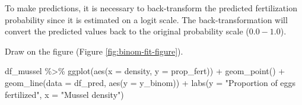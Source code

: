 \documentclass[
]{book}
\newenvironment{Shaded}{\begin{snugshade}}{\end{snugshade}}
\newcommand{\AttributeTok}[1]{\textcolor[rgb]{0.77,0.63,0.00}{#1}}
\newcommand{\CommentTok}[1]{\textcolor[rgb]{0.56,0.35,0.01}{\textit{#1}}}
\newcommand{\DecValTok}[1]{\textcolor[rgb]{0.00,0.00,0.81}{#1}}
\newcommand{\FunctionTok}[1]{\textcolor[rgb]{0.00,0.00,0.00}{#1}}
\newcommand{\NormalTok}[1]{#1}
\newcommand{\OtherTok}[1]{\textcolor[rgb]{0.56,0.35,0.01}{#1}}
\newcommand{\SpecialCharTok}[1]{\textcolor[rgb]{0.00,0.00,0.00}{#1}}
\newcommand{\StringTok}[1]{\textcolor[rgb]{0.31,0.60,0.02}{#1}}
\begin{document}
To make predictions, it is necessary to back-transform the predicted fertilization probability since it is estimated on a logit scale. The back-transformation will convert the predicted values back to the original probability scale (\(0.0-1.0\)).

\begin{Shaded}
\end{Shaded}

Draw on the figure (Figure \ref{fig:binom-fit-figure}).

\begin{Shaded}
\begin{Highlighting}[]
\NormalTok{df\_mussel }\SpecialCharTok{\%\textgreater{}\%} 
  \FunctionTok{ggplot}\NormalTok{(}\FunctionTok{aes}\NormalTok{(}\AttributeTok{x =}\NormalTok{ density,}
             \AttributeTok{y =}\NormalTok{ prop\_fert)) }\SpecialCharTok{+}
  \FunctionTok{geom\_point}\NormalTok{() }\SpecialCharTok{+}
  \FunctionTok{geom\_line}\NormalTok{(}\AttributeTok{data =}\NormalTok{ df\_pred,}
            \FunctionTok{aes}\NormalTok{(}\AttributeTok{y =}\NormalTok{ y\_binom)) }\SpecialCharTok{+}
  \FunctionTok{labs}\NormalTok{(}\AttributeTok{y =} \StringTok{"Proportion of eggs fertilized"}\NormalTok{,}
       \AttributeTok{x =} \StringTok{"Mussel density"}\NormalTok{)}
\end{Highlighting}
\end{Shaded}
\end{document}
